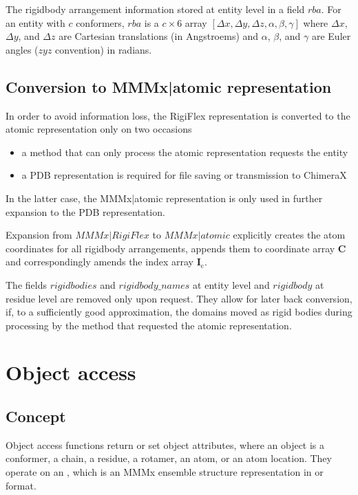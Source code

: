 \documentclass[letterpaper,10pt,english]{sphinxmanual}
\begin{document}
The rigid\sphinxhyphen{}body arrangement information stored at entity level in a field \(rba\).
For an entity with \(c\) conformers, \(rba\) is a \(c \times 6\) array \([\Delta x, \Delta y, \Delta z, \alpha, \beta, \gamma]\)
where \(\Delta x\), \(\Delta y\), and \(\Delta z\) are Cartesian translations (in Angstroems) and \(\alpha\), \(\beta\), and \(\gamma\) are Euler angles (\(zyz\) convention) in radians.


\section{Conversion to MMMx|atomic representation}
\label{\detokenize{MMMx_RigiFlex:conversion-to-mmmx-atomic-representation}}
In order to avoid information loss, the RigiFlex representation is converted to the atomic representation only on two occasions
\begin{itemize}
\item {} 
a method that can only process the atomic representation requests the entity

\item {} 
a PDB representation is required for file saving or transmission to ChimeraX

\end{itemize}

In the latter case, the MMMx|atomic representation is only used in further expansion to the PDB representation.

Expansion from \(MMMx|RigiFlex\) to \(MMMx|atomic\) explicitly creates the atom coordinates for all rigid\sphinxhyphen{}body arrangements,
appends them to coordinate array \(\mathbf{C}\) and correspondingly amends the index array \(\mathbf{I}_\mathrm{c}\).

The fields \(rigidbodies\) and \(rigidbody\_names\) at entity level and \(rigidbody\) at residue level are removed only upon request.
They allow for later back conversion, if, to a sufficiently good approximation, the domains moved as rigid bodies during
processing by the method that requested the atomic representation.


\chapter{Object access}
\label{\detokenize{object_access:object-access}}\label{\detokenize{object_access:id1}}\label{\detokenize{object_access::doc}}

\section{Concept}
\label{\detokenize{object_access:concept}}
Object access functions return or set object attributes, where an object is a conformer, a chain, a residue, a rotamer, an atom, or an atom location.
They operate on an , which is an MMMx ensemble structure representation in {\hyperref[\detokenize{MMMx_atomic:mmmx-atomic}]{}} or {\hyperref[\detokenize{MMMx_RigiFlex:mmmx-rigiflex}]{}} format.
\end{document}
